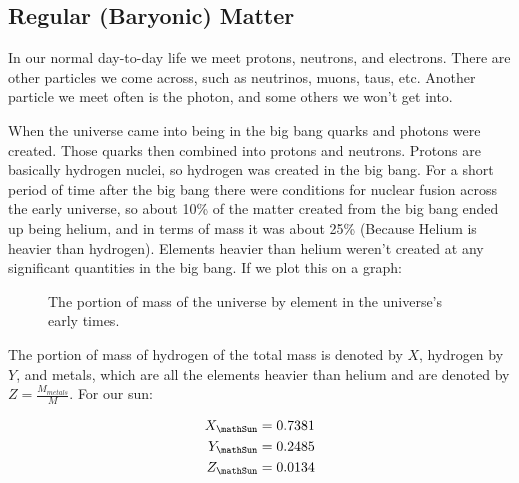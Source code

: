 \subsection{Regular (Baryonic) Matter}

In our normal day-to-day life we meet protons, neutrons, and electrons. There are other particles we come across, such as neutrinos, muons, taus, etc. Another particle we meet often is the photon, and some others we won't get into.

When the universe came into being in the big bang quarks and photons were created. Those quarks then combined into protons and neutrons. Protons are basically hydrogen nuclei, so hydrogen was created in the big bang. For a short period of time after the big bang there were conditions for nuclear fusion across the early universe, so about 10\% of the matter created from the big bang ended up being helium, and in terms of mass it was about 25\% (Because Helium is heavier than hydrogen). Elements heavier than helium weren't created at any significant quantities in the big bang. If we plot this on a graph:

\begin{figure}
	\caption{The portion of mass of the universe by element in the universe's early times.}
\end{figure}



The portion of mass of hydrogen of the total mass is denoted by \(X\), hydrogen by \(Y\), and metals, which are all the elements heavier than helium and are denoted by \(Z=\frac{M_{metals}}{M}\). For our sun:

\begin{align}
	X_\mathSun &= 0.7381\\
	Y_\mathSun &= 0.2485\\
	Z_\mathSun &= 0.0134
\end{align}

